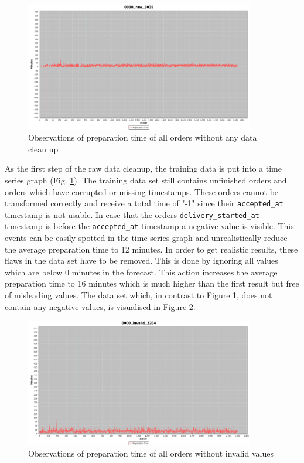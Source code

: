 \begin{figure}[h]
\begin{center}
\includegraphics[width=10cm]{images/0000_raw_3035.png}
\caption{Observations of preparation time of all orders without any data clean up}
\label{fig:0000_raw_3035}
\end{center}
\end{figure}

As the first step of the raw data cleanup, the training data is put into a time series graph (Fig. \ref{fig:0000_raw_3035}). The training data set still contains unfinished orders and orders which have corrupted or missing timestamps. These orders cannot be transformed correctly and receive a total time of "-1" since their \texttt{accepted\_at} timestamp is not usable. In case that the orders \texttt{delivery\_started\_at} timestamp is before the \texttt{accepted\_at} timestamp a negative value is visible. This events can be easily spotted in the time series graph and unrealistically reduce the average preparation time to 12 minutes. In order to get realistic results, these flaws in the data set have to be removed. This is done by ignoring all values which are below 0 minutes in the forecast. This action increases the average preparation time to 16 minutes which is much higher than the first result but free of misleading values. The data set which, in contrast to Figure \ref{fig:0000_raw_3035}, does not contain any negative values, is visualised in Figure \ref{fig:0000_invalid_2204}.

\begin{figure}[h]
\begin{center}
\includegraphics[width=10cm]{images/0000_invalid_2204.png}
\caption{Observations of preparation time of all orders without invalid values}
\label{fig:0000_invalid_2204}
\end{center}
\end{figure}

